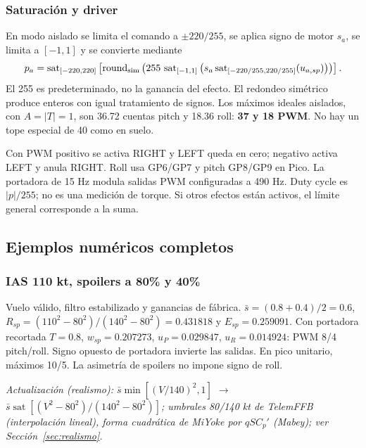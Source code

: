 \documentclass[11pt,a4paper]{article}
\newcommand{\code}[1]{\texttt{\detokenize{#1}}}
\newcommand{\sat}{\operatorname{sat}}
\begin{document}
\subsubsection{Saturación y driver}
En modo aislado se limita el comando a $\pm220/255$, se aplica signo de motor $s_a$, se limita a $[-1,1]$ y se convierte mediante
\begin{equation}
p_a=\sat_{[-220,220]}\left[\operatorname{round}_{\rm sim}
\left(255\,\sat_{[-1,1]}\left(s_a\sat_{[-220/255,220/255]}(u_{a,sp})\right)\right)\right].
\end{equation}
El 255 es \code{PWM_MAX} predeterminado, no la ganancia del efecto. El redondeo simétrico produce enteros con igual tratamiento de signos. Los máximos ideales aislados, con $A=|T|=1$, son 36.72 cuentas pitch y 18.36 roll: \textbf{37 y 18 PWM}. No hay un tope especial de 40 como en suelo.

Con PWM positivo se activa RIGHT y LEFT queda en cero; negativo activa LEFT y anula RIGHT. Roll usa GP6/GP7 y pitch GP8/GP9 en Pico. La portadora de 15 Hz modula salidas PWM configuradas a 490 Hz. Duty cycle es $|p|/255$; no es una medición de torque. Si otros efectos están activos, el límite general corresponde a la suma.

\subsection{Ejemplos numéricos completos}
\subsubsection{IAS 110 kt, spoilers a 80\% y 40\%}
Vuelo válido, filtro estabilizado y ganancias de fábrica. $\bar s=(0.8+0.4)/2=0.6$, $R_{sp}=(110^2-80^2)/(140^2-80^2)=0.431818$ y $E_{sp}=0.259091$. Con portadora recortada $T=0.8$, $w_{sp}=0.207273$, $u_P=0.029847$, $u_R=0.014924$: PWM 8/4 pitch/roll. Signo opuesto de portadora invierte las salidas. En pico unitario, máximos 10/5. La asimetría de spoilers no impone signo de roll.

\textit{Actualización (realismo): $\bar s\min[(V/140)^2,1]$ $\rightarrow$ $\bar s\sat[(V^2-80^2)/(140^2-80^2)]$; umbrales 80/140 kt de TelemFFB (interpolación lineal), forma cuadrática de MiYoke por $qSC_p'$ (Mabey); ver Sección~\ref{sec:realismo}.}
\end{document}
